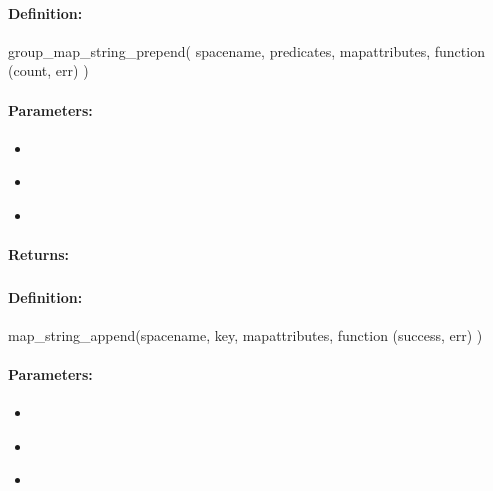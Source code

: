 \paragraph{Definition:}
\begin{javascriptcode}
group_map_string_prepend(
        spacename, predicates, mapattributes, function (count, err) {})
\end{javascriptcode}
\paragraph{Parameters:}
\begin{itemize}[noitemsep]
\item {}\\

\item {}\\

\item {}\\

\end{itemize}

\paragraph{Returns:}


\pagebreak
\subsubsection{}
\label{api:nodejs:map_string_append}


\paragraph{Definition:}
\begin{javascriptcode}
map_string_append(spacename, key, mapattributes, function (success, err) {})
\end{javascriptcode}
\paragraph{Parameters:}
\begin{itemize}[noitemsep]
\item {}\\

\item {}\\

\item {}\\

\end{itemize}

